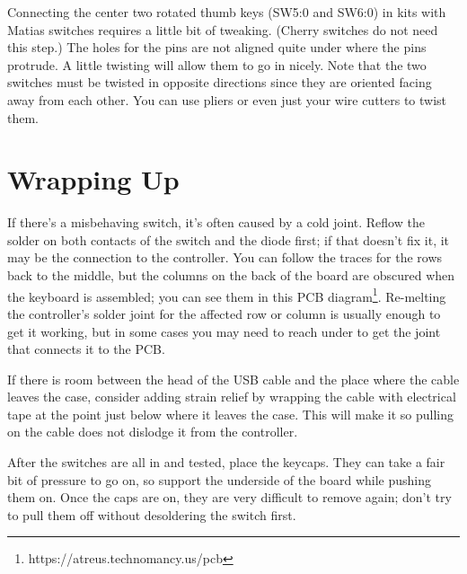 \documentclass{article}
\begin{document}

Connecting the center two rotated thumb keys (SW5:0 and SW6:0) in kits
with Matias switches requires a little bit of tweaking. (Cherry
switches do not need this step.) The holes for the pins are not
aligned quite under where the pins protrude. A little twisting will
allow them to go in nicely. Note that the two switches must be twisted
in opposite directions since they are oriented facing away from each
other. You can use pliers or even just your wire cutters to twist
them.

\section{Wrapping Up}

If there's a misbehaving switch, it's often caused by a cold
joint. Reflow the solder on both contacts of the switch and the diode
first; if that doesn't fix it, it may be the connection to the
controller. You can follow the traces for the rows back to the middle,
but the columns on the back of the board are obscured when the
keyboard is assembled; you can see them in this PCB
diagram\footnote{https://atreus.technomancy.us/pcb}.
Re-melting the controller's solder joint for the affected row or
column is usually enough to get it working, but in some cases you may
need to reach under to get the joint that connects it to the PCB.

\vspace{1em}

If there is room between the head of the USB cable and the place where
the cable leaves the case, consider adding strain relief by wrapping
the cable with electrical tape at the point just below where it leaves
the case. This will make it so pulling on the cable does not dislodge
it from the controller.

\vspace{1em}

After the switches are all in and tested, place the keycaps. They can
take a fair bit of pressure to go on, so support the underside of the
board while pushing them on. Once the caps are on, they are very
difficult to remove again; don't try to pull them off without
desoldering the switch first.
\end{document}
